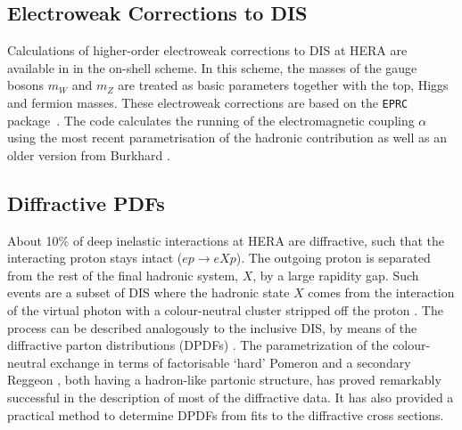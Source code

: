 \subsection{Electroweak Corrections to DIS}
Calculations of higher-order electroweak corrections to DIS at 
HERA are available in \fitter in the on-shell scheme. In this scheme, the
masses of the gauge bosons $m_W$ and 
$m_Z$ are treated as basic parameters together with the top, 
Higgs and fermion masses.
These electroweak corrections 
are based on the \texttt{EPRC} package~\cite{SpiesbergerPrivComm}.
The code calculates the running of the electromagnetic coupling $\alpha$ using the most recent parametrisation
of the hadronic contribution
\cite{Jegerlehner} as well as 
an older version from Burkhard \cite{Burkhard}.



\subsection{Diffractive PDFs}

\newcommand{\asotp}{\ensuremath{\frac{\alpha_{\rm s}}{2\pi}}}
\newcommand{\Sgl}[1]{\ensuremath{\tilde f_{#1+}}}
\newcommand{\Pom}{{I\!P}}
\newcommand{\Reg}{{I\!R}}
\newcommand{\xpom}{$x_{I\!P}$}
\newcommand{\xP}{x_\Pom}


About 10\% of deep inelastic interactions at HERA are diffractive, such that the interacting proton stays intact ($ep\to eXp$). 
The outgoing proton is separated from the rest of the final hadronic system, $X$, by a large rapidity gap.  
Such events are a subset of DIS where the hadronic state $X$ comes from the interaction of the
virtual photon with a colour-neutral cluster stripped off the proton \cite{Hebecker:1999vf}.
The process can be described analogously to the inclusive DIS, by means of the diffractive parton distributions 
(DPDFs) \cite{Collins:1997sr}.
The parametrization of the colour-neutral exchange in terms of factorisable `hard' Pomeron and a secondary 
Reggeon \cite{Ingelman:1984ns}, both having a hadron-like partonic structure, 
has proved remarkably successful in the description of most of the diffractive data.
It has also provided a practical method to determine DPDFs from fits to the diffractive cross sections.

